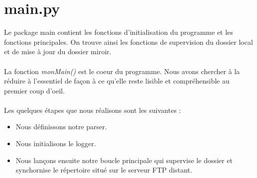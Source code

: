 \section{main.py}

Le package main contient les fonctions d'initialisation du programme et les fonctions principales. 
On trouve ainsi les fonctions de supervision du dossier local et de mise à jour du dossier miroir.\\
\\
La fonction \textit{monMain()} est le coeur du programme.
Nous avons chercher à la réduire à l'essentiel de façon à ce qu'elle reste lisible et compréhensible au premier coup d'oeil.\\
\\
Les quelques étapes que nous réalisons sont les suivantes :
\begin{itemize}
\item Nous définissons notre parser.
\item Nous initialisons le logger.
\item Nous lançons ensuite notre boucle principale qui supervise le dossier et synchornise le répertoire situé sur le serveur FTP distant.
\end{itemize}
